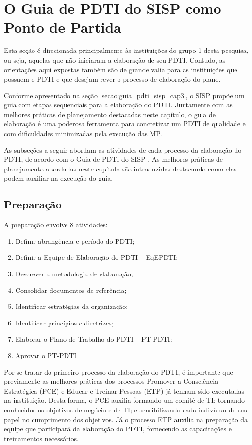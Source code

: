\newpage

\section{O Guia de PDTI do SISP como Ponto de Partida}
Esta seção é direcionada principalmente às instituições do grupo 1 desta pesquisa, ou seja, aquelas que não iniciaram a elaboração de seu PDTI. Contudo, as orientações aqui expostas também são de grande valia para as instituições que possuem o PDTI e que desejam rever o processo de elaboração do plano.

Conforme apresentado na seção \ref{secao:guia_pdti_sisp_cap3}, o SISP propõe um guia com etapas sequenciais para a elaboração do PDTI. Juntamente com as melhores práticas de planejamento destacadas neste capítulo, o guia de elaboração é uma poderosa ferramenta para concretizar um PDTI de qualidade e com dificuldades minimizadas pela execução das MP.

As subseções a seguir abordam as atividades de cada processo da elaboração do PDTI, de acordo com o Guia de PDTI do SISP \cite{sisp:15}. As melhores práticas de planejamento abordadas neste capítulo são introduzidas destacando como elas podem auxiliar na execução do guia.

\subsection{Preparação}

A preparação envolve 8 atividades:
\begin{enumerate}
\item Definir abrangência e período do PDTI;
\item Definir a Equipe de Elaboração do PDTI – EqEPDTI;
\item Descrever a metodologia de elaboração;
\item Consolidar documentos de referência;
\item Identificar estratégias da organização;
\item Identificar princípios e diretrizes;
\item Elaborar o Plano de Trabalho do PDTI – PT-PDTI;
\item Aprovar o PT-PDTI
\end{enumerate}

Por se tratar do primeiro processo da elaboração do PDTI, é importante que previamente as melhores práticas dos processos Promover a Consciência Estratégica (PCE) e Educar e Treinar Pessoas (ETP) já tenham sido executadas na instituição. Desta forma, o PCE auxilia formando um comitê de TI; tornando conhecidos os objetivos de negócio e de TI; e sensibilizando cada indivíduo do seu papel no cumprimento dos objetivos. Já o processo ETP auxilia na preparação da equipe que participará da elaboração do PDTI, fornecendo as capacitações e treinamentos necessários.


